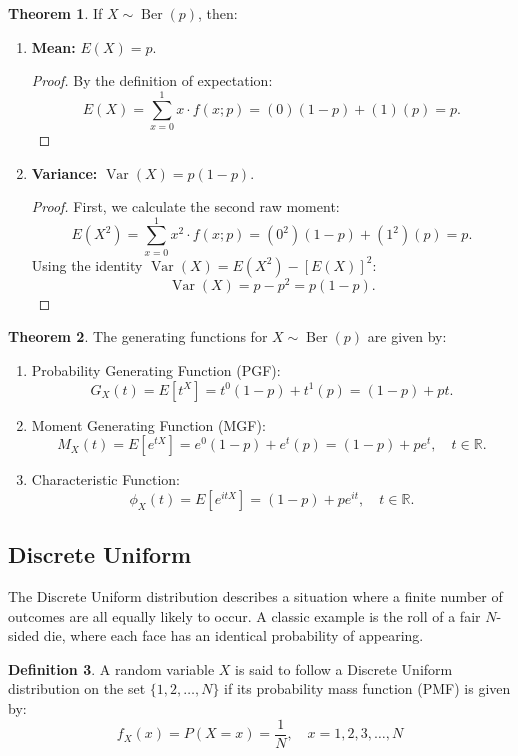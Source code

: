 \documentclass[12pt,a4paper]{report}
\theoremstyle{definition}
\newtheorem{thm}{Theorem}[section]
\newtheorem{definition}[thm]{Definition}
\theoremstyle{plain}
\theoremstyle{definition}
\begin{document}
\begin{thm}
If $X \sim \operatorname{Ber}(p)$, then:
\begin{enumerate}
\item \textbf{Mean:} $E(X) = p$.
\begin{proof}
By the definition of expectation:\[ E(X) = \sum_{x=0}^{1} x \cdot f(x; p) = (0)(1-p) + (1)(p) = p. \]
\end{proof}

\item \textbf{Variance:} $\operatorname{Var}(X) = p(1-p)$.
\begin{proof}
First, we calculate the second raw moment:
\[ E(X^2) = \sum_{x=0}^{1} x^2 \cdot f(x; p) = (0^2)(1-p) + (1^2)(p) = p. \]
Using the identity $\operatorname{Var}(X) = E(X^2) - [E(X)]^2$:
\[ \operatorname{Var}(X) = p - p^2 = p(1-p). \]
\end{proof}
\end{enumerate}
\end{thm}




\begin{thm}
The generating functions for $X \sim \operatorname{Ber}(p)$ are given by:
\begin{enumerate}
\item Probability Generating Function (PGF): \[ G_X(t) = E[t^X] = t^0(1-p) + t^1(p) = (1-p) + pt. \]
\item Moment Generating Function (MGF):
\[ M_X(t) = E[e^{tX}] = e^{0}(1-p) + e^{t}(p) = (1-p) + pe^t, \quad t \in \mathbb{R}. \]
\item Characteristic Function:
\[ \phi_X(t) = E[e^{itX}] = (1-p) + pe^{it}, \quad t \in \mathbb{R}. \]
\end{enumerate}\end{thm}










\subsection{Discrete Uniform}
The Discrete Uniform distribution describes a situation where a finite number of outcomes are all equally likely to occur. A classic example is the roll of a fair $N$-sided die, where each face has an identical probability of appearing.



\begin{definition}
A random variable $X$ is said to follow a Discrete Uniform distribution on the set $\{1, 2, \dots, N\}$ if its probability mass function (PMF) is given by:\[ f_X(x) = P(X=x) = \frac{1}{N}, \quad x = 1, 2, 3, \dots, N \]
\end{definition}
\end{document}

